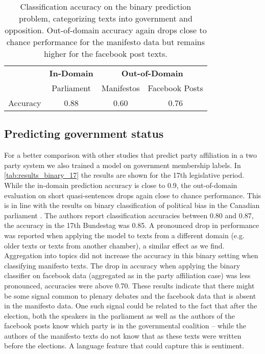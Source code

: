 \documentclass[11pt]{article}
\begin{document}
\begin{table*}[t]
\caption{
\label{tab:results_binary_17}
Classification accuracy on the binary prediction problem, categorizing texts into government and opposition. Out-of-domain accuracy again drops close to chance performance for the manifesto data but remains higher for the facebook post texts. 
}
\begin{center}
\begin{tabular}{lccc}
& {\bf In-Domain} & \multicolumn{2}{c}{{\bf Out-of-Domain}}\\
& Parliament & Manifestos & Facebook Posts\\
\hline
Accuracy    &   0.88   &   0.60&      0.76\\
%
\end{tabular}
\end{center}
\end{table*}


\subsection{Predicting government status}\label{sec:sentiment_result}
For a better comparison with other studies that predict party affiliation in a two party system we also trained a model on government membership labels. In \autoref{tab:results_binary_17} the results are shown for the 17th legislative period. While the in-domain prediction accuracy is close to 0.9, the out-of-domain evaluation on short quasi-sentences drops again close to chance performance. This is in line with the results on binary classification of political bias in the Canadian parliament \cite{Yu2008}. The authors report classification accuracies between 0.80 and 0.87, the accuracy in the 17th Bundestag was 0.85. A pronounced drop in performance was reported when applying the model to texts from a different domain (e.g. older texts or texts from another chamber), a similar effect as we find. Aggregation into topics did not increase the accuracy in this binary setting when classifying manifesto texts. The drop in accuracy when applying the binary classifier on facebook data (aggregated as in the party affiliation case) was less pronounced, accuracies were above 0.70. These results indicate that there might be some signal common to plenary debates and the facebook data that is absent in the manifesto data. One such signal could be related to the fact that after the election, both the speakers in the parliament as well as the authors of the facebook posts  know which party is in the governmental coalition -- while the authors of the manifesto texts do not know that as these texts were written before the elections. A language feature that could capture this is sentiment. 
\end{document}
